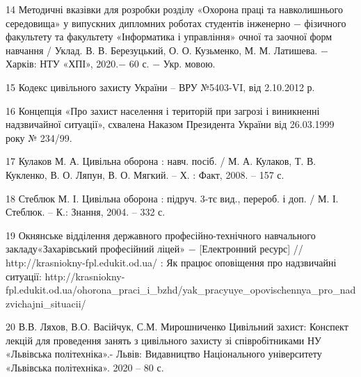 14 Методичні вказівки для розробки розділу «Охорона праці та навколишнього середовища» у випускних дипломних роботах студентів інженерно $-$ фізичного факультету та факультету «Інформатика і управління» очної та заочної форм навчання / Уклад. В. В. Березуцький, О. О. Кузьменко, М. М. Латишева. $-$ Харків: НТУ «ХПІ», 2020.$-$ 60 с. $-$ Укр. мовою.

15 Кодекс цивільного захисту України – ВРУ №5403-VI, від 2.10.2012 р.

16 Концепція «Про захист населення і територій при загрозі і виникненні надзвичайної ситуації», схвалена Наказом Президента України від 26.03.1999 року № 234/99.

17 Кулаков М. А. Цивільна оборона : навч. посіб. / М. А. Кулаков, Т. В. Кукленко, В. О. Ляпун, В. О. Мягкий. – Х. : Факт, 2008. – 157 с.

18 Стеблюк М. І. Цивільна оборона  : підруч. 3-тє вид., перероб. і доп. / М. І. Стеблюк. – К.: Знання, 2004. – 332 с.

19 Окнянське відділення державного професійно-технічного навчального закладу«Захарівський професійний ліцей» $-$ [Електронний ресурс] // http://krasniokny-fpl.edukit.od.ua/ : Як працює оповіщення про надзвичайні ситуації: http://krasniokny-fpl.edukit.od.ua/ohorona_praci_i_bzhd/yak_pracyuye_opovischennya_pro_nadzvichajni_situacii/

20 В.В. Ляхов, В.О. Васійчук, С.М. Мирошниченко Цивільний захист: Конспект лекцій для проведення занять з цивільного захисту зі співробітниками НУ «Львівська політехніка».- Львів: Видавництво Національного університету «Львівська політехніка». 2020 – 80 с.
